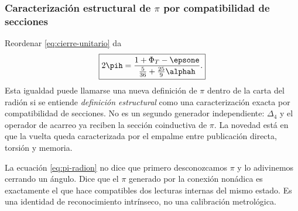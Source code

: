 \subsubsection{Caracterización estructural de \(\pi\) por compatibilidad de secciones}

Reordenar \eqref{eq:cierre-unitario} da
\begin{equation}
\boxed{
2\pih=
\frac{1+\Phi_T-\epsone}
{\frac5{36}+\frac{25}{9}\alphah}.}
\label{eq:pi-radion}
\end{equation}
Esta igualdad puede llamarse una nueva definición de \(\pi\) dentro de la
carta del radión si se entiende \emph{definición estructural} como una
caracterización exacta por compatibilidad de secciones. No es un segundo
generador independiente: \(\Delta_4\) y el operador de acarreo ya reciben la
sección coinductiva de \(\pi\). La novedad está en que la vuelta queda
caracterizada por el empalme entre publicación directa, torsión y memoria.

\begin{narrativebox}
La ecuación \eqref{eq:pi-radion} no dice que primero desconozcamos \(\pi\) y
lo adivinemos cerrando un ángulo. Dice que el \(\pi\) generado por la conexión
nonádica es exactamente el que hace compatibles dos lecturas internas del
mismo estado. Es una identidad de reconocimiento intrínseco, no una
calibración metrológica.
\end{narrativebox}
